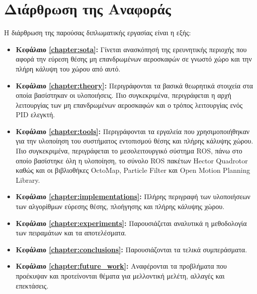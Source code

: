 \section{Διάρθρωση της Αναφοράς}
\label{section:layout}

Η διάρθρωση της παρούσας διπλωματικής εργασίας είναι η εξής:

\begin{itemize}
  \item{\textbf{Κεφάλαιο \ref{chapter:sota}:}
      Γίνεται ανασκόπησή της ερευνητικής περιοχής που αφορά την εύρεση θέσης μη επανδρωμένων αεροσκαφών σε γνωστό χώρο και την πλήρη κάλυψη του χώρου από αυτό.
    }
  \item{\textbf{Κεφάλαιο \ref{chapter:theory}:} Περιγράφονται τα βασικά θεωρητικά στοιχεία
  στα οποία βασίστηκαν οι υλοποιήσεις. Πιο συγκεκριμένα, περιγράφεται η αρχή λειτουργίας των μη επανδρωμένων αεροσκαφών και ο τρόπος λειτουργίας ενός PID ελεγκτή.
    }
  \item{\textbf{Κεφάλαιο \ref{chapter:tools}:} Περιγράφονται τα εργαλεία που χρησιμοποιήθηκαν για την υλοποίηση του συστήματος εντοπισμού θέσης και πλήρης κάλυψης χώρου. Πιο συγκεκριμένα, περιγράφεται το μεσολειτουργικό σύστημα ROS, πάνω στο οποίο βασίστηκε όλη η υλοποίηση, το σύνολο ROS πακέτων Hector Quadrotor καθώς και οι βιβλιοθήκες OctoMap, Particle Filter και Open Motion Planning Library.
    }
  \item{\textbf{Κεφάλαιο \ref{chapter:implementations}:} Πλήρης περιγραφή των υλοποιήσεων των αλγορίθμων εύρεσης θέσης, πλοήγησης και πλήρης κάλυψης χώρου. 
    }
  \item{\textbf{Κεφάλαιο \ref{chapter:experiments}:} Παρουσιάζεται αναλυτικά η μεθοδολογία των
      πειραμάτων και τα αποτελέσματα.
    }
  \item{\textbf{Κεφάλαιο \ref{chapter:conclusions}:} Παρουσιάζονται τα τελικά συμπεράσματα.
    }
  \item{\textbf{Κεφάλαιο \ref{chapter:future_work}:} Αναφέρονται τα
      προβλήματα που προέκυψαν και προτείνονται θέματα για μελλοντική
      μελέτη, αλλαγές και επεκτάσεις.
    }
\end{itemize}